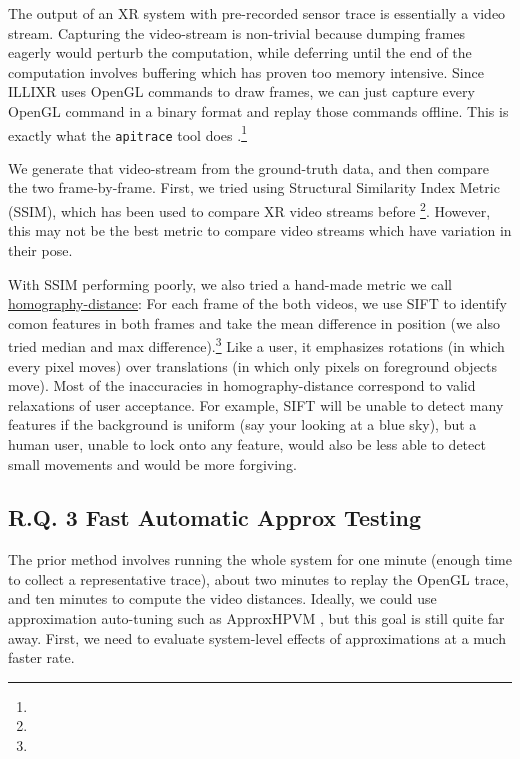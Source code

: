 The output of an XR system with pre-recorded sensor trace is essentially a video stream.
Capturing the video-stream is non-trivial because dumping frames eagerly would perturb the computation, while deferring until the end of the computation involves buffering which has proven too memory intensive.
Since ILLIXR uses OpenGL commands to draw frames, we can just capture every OpenGL command in a binary format and replay those commands offline.
This is exactly what the \verb+apitrace+ tool does \cite{apitrace}.\footnote{}

We generate that video-stream from the ground-truth data, and then compare the two frame-by-frame.
First, we tried using Structural Similarity Index Metric (SSIM), which has been used to compare XR video streams before \footnote{}.
However, this may not be the best metric to compare video streams which have variation in their pose.

With SSIM performing poorly, we also tried a hand-made metric we call \ul{homography-distance}:
For each frame of the both videos, we use SIFT to identify comon features in both frames  and take the mean difference in position (we also tried median and max difference).\footnote{}
Like a user, it emphasizes rotations (in which every pixel moves) over translations (in which only pixels on foreground objects move).
Most of the inaccuracies in homography-distance correspond to valid relaxations of user acceptance.
For example, SIFT will be unable to detect many features if the background is uniform (say your looking at a blue sky),
    but a human user, unable to lock onto any feature, would also be less able to detect small movements and would be more forgiving.

\subsection{R.Q. 3 Fast Automatic Approx Testing}

The prior method involves running the whole system for one minute (enough time to collect a representative trace), about two minutes to replay the OpenGL trace, and ten minutes to compute the video distances.
Ideally, we could use approximation auto-tuning such as ApproxHPVM \cite{approxhpvm}, but this goal is still quite far away. First, we need to evaluate system-level effects of approximations at a much faster rate.

